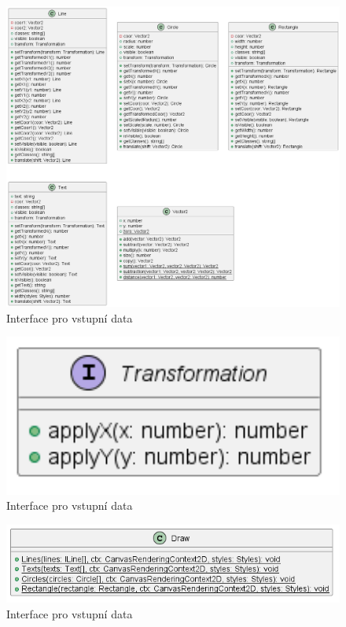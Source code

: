 \begin{figure}[H]
  \centering
  \includegraphics[width=145mm]{../img/primitives.png}
  \caption{Interface pro vstupní data}
\end{figure}

\begin{figure}[H]
  \centering
  \includegraphics[width=145mm]{../img/iTransformation.png}
  \caption{Interface pro vstupní data}
\end{figure}

\begin{figure}[H]
  \centering
  \includegraphics[width=145mm]{../img/draw.png}
  \caption{Interface pro vstupní data}
\end{figure}

